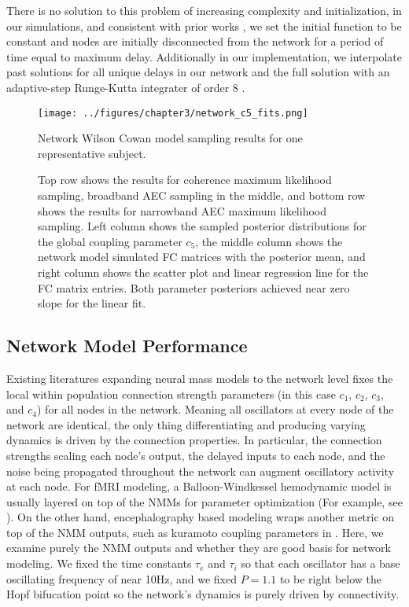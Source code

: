 There is no solution to this problem of increasing complexity and initialization, in our simulations, and consistent with prior works \cite{hadida_bayesian_2018}, we set the initial function to be constant and nodes are initially disconnected from the network for a period of time equal to maximum delay. Additionally in our implementation, we interpolate past solutions for all unique delays in our network and the full solution with an adaptive-step Runge-Kutta integrater of order 8 \cite{hairer_analysis_2008}.


\begin{figure}[htbp]
    \centering
    \texttt{[image: ../figures/chapter3/network\_c5\_fits.png]}
    \caption{Network Wilson Cowan model sampling results for one representative subject.}
    \caption*{Top row shows the results for coherence maximum likelihood sampling, broadband AEC sampling in the middle, and bottom row shows the results for narrowband AEC maximum likelihood sampling. Left column shows the sampled posterior distributions for the global coupling parameter $c_5$, the middle column shows the network model simulated FC matrices with the posterior mean, and right column shows the scatter plot and linear regression line for the FC matrix entries. Both parameter posteriors achieved near zero slope for the linear fit.}
    \label{fig:networkc5}
\end{figure}

\subsection{Network Model Performance}
Existing literatures expanding neural mass models to the network level fixes the local within population connection strength parameters (in this case $c_1$, $c_2$, $c_3$, and $c_4$) for all nodes in the network. Meaning all oscillators at every node of the network are identical, the only thing differentiating and producing varying dynamics is driven by the connection properties. In particular, the connection strengths scaling each node's output, the delayed inputs to each node, and the noise being propagated throughout the network can augment oscillatory activity at each node. For fMRI modeling, a Balloon-Windkessel hemodynamic model \cite{buxton_dynamics_1998, friston_nonlinear_2000} is usually layered on top of the NMMs for parameter optimization (For example, see \cite{Zimmermann2018}). On the other hand, encephalography based modeling wraps another metric on top of the NMM outputs, such as kuramoto coupling parameters in \cite{Deco2009}. Here, we examine purely the NMM outputs and whether they are good basis for network modeling. We fixed the time constants $\tau_e$ and $\tau_i$ so that each oscillator has a base oscillating frequency of near 10Hz, and we fixed $P = 1.1$ to be right below the Hopf bifucation point so the network's dynamics is purely driven by connectivity. 

